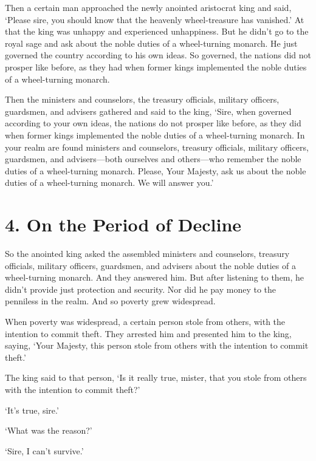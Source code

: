 \documentclass[12pt,openany]{book}%
\begin{document}
Then a certain man approached the newly anointed aristocrat king and said, ‘Please sire, you should know that the heavenly wheel-treasure has vanished.’ At that the king was unhappy and experienced unhappiness. But he didn’t go to the royal sage and ask about the noble duties of a wheel-turning monarch. He just governed the country according to his own ideas. So governed, the nations did not prosper like before, as they had when former kings implemented the noble duties of a wheel-turning monarch. 

Then the ministers and counselors, the treasury officials, military officers, guardsmen, and advisers gathered and said to the king, ‘Sire, when governed according to your own ideas, the nations do not prosper like before, as they did when former kings implemented the noble duties of a wheel-turning monarch. In your realm are found ministers and counselors, treasury officials, military officers, guardsmen, and advisers—both ourselves and others—who remember the noble duties of a wheel-turning monarch. Please, Your Majesty, ask us about the noble duties of a wheel-turning monarch. We will answer you.’ 

\section*{4. On the Period of Decline }

So the anointed king asked the assembled ministers and counselors, treasury officials, military officers, guardsmen, and advisers about the noble duties of a wheel-turning monarch. And they answered him. But after listening to them, he didn’t provide just protection and security. Nor did he pay money to the penniless in the realm. And so poverty grew widespread. 

When poverty was widespread, a certain person stole from others, with the intention to commit theft. They arrested him and presented him to the king, saying, ‘Your Majesty, this person stole from others with the intention to commit theft.’ 

The king said to that person, ‘Is it really true, mister, that you stole from others with the intention to commit theft?’ 

‘It’s true, sire.’ 

‘What was the reason?’ 

‘Sire, I can’t survive.’ 
\end{document}
